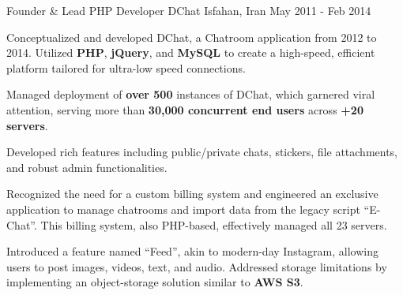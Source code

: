 \begin{cventries}
  \cventry
    {Founder \& Lead PHP Developer} %
    {DChat} %
    {Isfahan, Iran} %
    {May 2011 - Feb 2014} %
    {
      \begin{cvitems} %
        \item {Conceptualized and developed DChat, a Chatroom application from 2012 to 2014. Utilized \textbf{PHP}, \textbf{jQuery}, and \textbf{MySQL} to create a high-speed, efficient platform tailored for ultra-low speed connections.}
        \item {Managed deployment of \textbf{over 500} instances of DChat, which garnered viral attention, serving more than \textbf{30,000 concurrent end users} across \textbf{+20 servers}.}
        \item {Developed rich features including public/private chats, stickers, file attachments, and robust admin functionalities.}
        \item {Recognized the need for a custom billing system and engineered an exclusive application to manage chatrooms and import data from the legacy script “E-Chat”. This billing system, also PHP-based, effectively managed all 23 servers.}
        \item {Introduced a feature named “Feed”, akin to modern-day Instagram, allowing users to post images, videos, text, and audio. Addressed storage limitations by implementing an object-storage solution similar to \textbf{AWS S3}.}
      \end{cvitems}
    }

\end{cventries}
